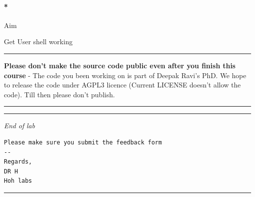 \documentclass[]{article}
\newenvironment{Shaded}{}{}
\newcommand{\ExtensionTok}[1]{{#1}}
\newcommand{\NormalTok}[1]{{#1}}
\let\oldparagraph\paragraph
\renewcommand{\paragraph}[1]{\oldparagraph{#1}\mbox{}}
\begin{document}
\begin{Shaded}
\end{Shaded}

\paragraph*{Aim}\label{aim-14}

Get User shell working

\begin{center}\rule{0.5\linewidth}{\linethickness}\end{center}

\textbf{Please don't make the source code public even after you finish
this course} - The code you been working on is part of Deepak Ravi's
PhD. We hope to release the code under AGPL3 licence (Current LICENSE
doesn't allow the code). Till then please don't publish.

\begin{center}\rule{0.5\linewidth}{\linethickness}\end{center}

\begin{center}\rule{0.5\linewidth}{\linethickness}\end{center}

\emph{End of lab }

\begin{verbatim}
Please make sure you submit the feedback form
--
Regards,
DR H
Hoh labs
\end{verbatim}

\begin{center}\rule{0.5\linewidth}{\linethickness}\end{center}
\end{document}
